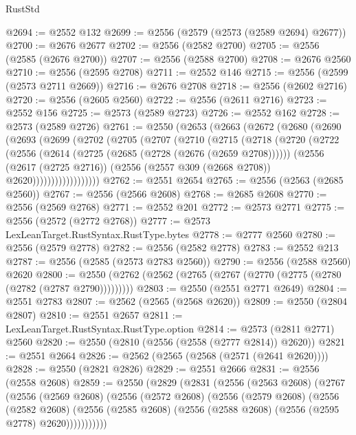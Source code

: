\begin{lexlean}{RustStd}
\begin{coremodule}
{\begin{coremodule}
{{{{{{{{{{{{{{{{{{{{{{{{{{{{{{{{@2694 := @2552 @132
@2699 := @2556 (@2579 (@2573 (@2589 @2694) @2677))
@2700 := @2676 @2677
@2702 := @2556 (@2582 @2700)
@2705 := @2556 (@2585 (@2676 @2700))
@2707 := @2556 (@2588 @2700)
@2708 := @2676 @2560
@2710 := @2556 (@2595 @2708)
@2711 := @2552 @146
@2715 := @2556 (@2599 (@2573 @2711 @2669))
@2716 := @2676 @2708
@2718 := @2556 (@2602 @2716)
@2720 := @2556 (@2605 @2560)
@2722 := @2556 (@2611 @2716)
@2723 := @2552 @156
@2725 := @2573 (@2589 @2723)
@2726 := @2552 @162
@2728 := @2573 (@2589 @2726)
@2761 := @2550
    (@2653
      (@2663
        (@2672
          (@2680
            (@2690
              (@2693
                (@2699
                  (@2702
                    (@2705
                      (@2707
                        (@2710
                          (@2715
                            (@2718
                              (@2720
                                (@2722
                                  (@2556
                                    (@2614 (@2725 (@2685 (@2728 (@2676 (@2659 @2708))))))
                                    (@2556
                                      (@2617 (@2725 @2716))
                                      (@2556 (@2557 @309 (@2668 @2708)) @2620))))))))))))))))))
@2762 := @2551 @2654
@2765 := @2556 (@2563 (@2685 @2560))
@2767 := @2556 (@2566 @2608)
@2768 := @2685 @2608
@2770 := @2556 (@2569 @2768)
@2771 := @2552 @201
@2772 := @2573 @2771
@2775 := @2556 (@2572 (@2772 @2768))
@2777 := @2573 LexLeanTarget.RustSyntax.RustType.bytes
@2778 := @2777 @2560
@2780 := @2556 (@2579 @2778)
@2782 := @2556 (@2582 @2778)
@2783 := @2552 @213
@2787 := @2556 (@2585 (@2573 @2783 @2560))
@2790 := @2556 (@2588 @2560) @2620
@2800 := @2550 (@2762 (@2562 (@2765 (@2767 (@2770 (@2775 (@2780 (@2782 (@2787 @2790)))))))))
@2803 := @2550 (@2551 @2771 @2649)
@2804 := @2551 @2783
@2807 := @2562 (@2565 (@2568 @2620))
@2809 := @2550 (@2804 @2807)
@2810 := @2551 @2657
@2811 := LexLeanTarget.RustSyntax.RustType.option
@2814 := @2573 (@2811 @2771) @2560
@2820 := @2550 (@2810 (@2556 (@2558 (@2777 @2814)) @2620))
@2821 := @2551 @2664
@2826 := @2562 (@2565 (@2568 (@2571 (@2641 @2620))))
@2828 := @2550 (@2821 @2826)
@2829 := @2551 @2666
@2831 := @2556 (@2558 @2608)
@2859 := @2550
    (@2829
      (@2831
        (@2556
          (@2563 @2608)
          (@2767
            (@2556
              (@2569 @2608)
              (@2556
                (@2572 @2608)
                (@2556
                  (@2579 @2608)
                  (@2556
                    (@2582 @2608)
                    (@2556 (@2585 @2608) (@2556 (@2588 @2608) (@2556 (@2595 @2778) @2620)))))))))))
}}}}}}}}}}}}}}}}}}}}}}}}}}}}}}}}
\end{coremodule}}
\end{coremodule}
\end{lexlean}
